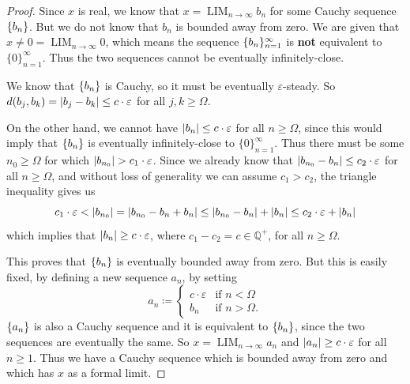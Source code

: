 { \label{lem:2}
\begin{proof}
    Since $x$ is real, we know that $x=\operatorname{LIM}_{n\to\infty}b_n$ for some Cauchy sequence $\{b_n\}$. But we do not know that $b_n$ is bounded away from zero. We are given that $x \neq 0 = \operatorname{LIM}_{n\to\infty}0$, which means the sequence $\{b_n\}_{n=1}^\infty$ is \textbf{not} equivalent to $\{0\}_{n=1}^\infty$. Thus the two sequences cannot be eventually infinitely-close. 
    
    We know that $\{b_n\}$ is Cauchy, so it must be eventually $\varepsilon$-steady. So $d(b_j, b_k) = \left\lvert b_j - b_k \right\rvert \leq c \cdot \varepsilon$ for all $j,k \geq \Omega$.

    On the other hand, we cannot have $\left\lvert b_n \right\rvert \leq c \cdot \varepsilon$ for all $n \geq \Omega$, since this would imply that $\{b_n\}$ is eventually infinitely-close to $\{0\}_{n=1}^\infty$. Thus there must be some $n_0 \geq \Omega$ for which $\left\lvert b_{n_0} \right\rvert > c_1 \cdot \varepsilon$. Since we already know that $\left\lvert b_{n_0}-b_n \right\rvert \leq c_2 \cdot \varepsilon$ for all $n\geq \Omega$, and without loss of generality we can assume $c_1>c_2$, the triangle inequality gives us
    \begin{equation*}
        c_1 \cdot \varepsilon <\left\lvert b_{n_0} \right\rvert = \left\lvert b_{n_0} - b_n + b_n \right\rvert \leq \left\lvert b_{n_0} - b_n \right\rvert + \left\lvert b_n \right\rvert \leq c_2 \cdot \varepsilon + \left\lvert b_n \right\rvert
    \end{equation*}
    which implies that $\left\lvert b_n \right\rvert \geq c \cdot \varepsilon$, where $c_1 - c_2 = c \in \mathbb{Q}^+$, for all $n\geq \Omega$.

    This proves that $\{b_n\}$ is eventually bounded away from zero. But this is easily fixed, by defining a new sequence $a_n$, by setting
    \begin{equation*}
a_n \coloneqq
\begin{cases}
c \cdot \varepsilon & \text{if } n < \Omega \\
b_n & \text{if } n > \Omega.
\end{cases}
    \end{equation*}
    $\{a_n\}$ is also a Cauchy sequence and it is equivalent to $\{b_n\}$, since the two sequences are eventually the same. So $x=\operatorname{LIM}_{n\to\infty}a_n$ and $\left\lvert a_n \right\rvert \geq c \cdot \varepsilon$ for all $n \geq 1$. Thus we have a Cauchy sequence which is bounded away from zero and which has $x$ as a formal limit.
\end{proof}

}
